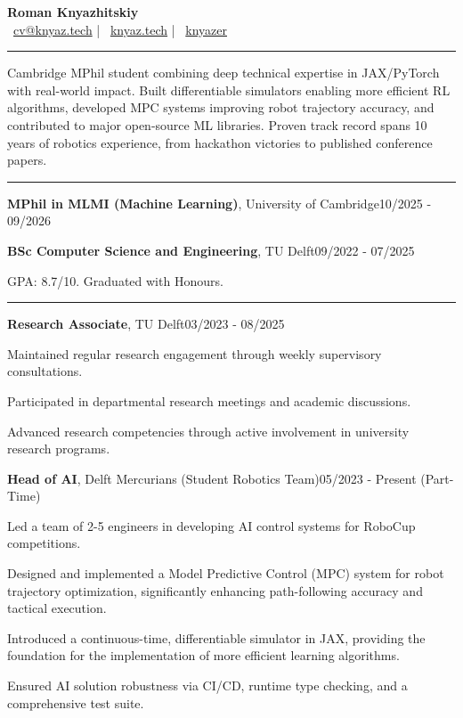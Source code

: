 \documentclass[11pt, a4paper]{article}
\newcommand{\entrytitle}[3]{%
    \noindent\textbf{#1}, #2\hfill#3%
}
\newcommand{\sectiontitle}[1]{\vspace{3mm}{\color{primaryColor}\noindent\textbf{#1}}\vspace{1.5mm}\hrule\vspace{2mm}}
\begin{document}
\begin{center}
    \LARGE{\textbf{\color{primaryColor}Roman Knyazhitskiy}}\\
    \vspace{2mm}
    \normalsize{
        \faEnvelope~\href{mailto:cv@knyaz.tech}{cv@knyaz.tech} \quad|\quad
        \faGlobe~\href{https://knyaz.tech}{knyaz.tech} \quad|\quad
        \faGithub~\href{https://github.com/knyazer}{knyazer}
    }
\end{center}

\sectiontitle{Summary}
\noindent
Cambridge MPhil student combining deep technical expertise in JAX/PyTorch with real-world impact. Built differentiable simulators enabling more efficient RL algorithms, developed MPC systems improving robot trajectory accuracy, and contributed to major open-source ML libraries. Proven track record spans 10 years of robotics experience, from hackathon victories to published conference papers.

\vspace{-2mm}


\sectiontitle{Education}

\entrytitle{MPhil in MLMI (Machine Learning)}{University of Cambridge}{10/2025 - 09/2026}

\entrytitle{BSc Computer Science and Engineering}{TU Delft}{09/2022 - 07/2025}
\begin{details}
    \item GPA: 8.7/10. Graduated with Honours.
\end{details}

\vspace{-2mm}


\sectiontitle{Work Experience}

\entrytitle{Research Associate}{TU Delft}{03/2023 - 08/2025}
\begin{details}
    \item Maintained regular research engagement through weekly supervisory consultations.
    \item Participated in departmental research meetings and academic discussions.
    \item Advanced research competencies through active involvement in university research programs.
\end{details}

\entrytitle{Head of AI}{Delft Mercurians (Student Robotics Team)}{05/2023 - Present (Part-Time)}
\begin{details}
    \item Led a team of 2-5 engineers in developing AI control systems for RoboCup competitions.
    \item Designed and implemented a Model Predictive Control (MPC) system for robot trajectory optimization, significantly enhancing path-following accuracy and tactical execution.
    \item Introduced a continuous-time, differentiable simulator in JAX, providing the foundation for the implementation of more efficient learning algorithms.
    \item Ensured AI solution robustness via CI/CD, runtime type checking, and a comprehensive test suite.
\end{details}
\end{document}

